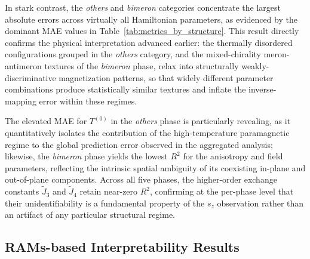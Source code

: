 \documentclass[final,5p,times,twocolumn]{elsarticle}
\begin{document}
In stark contrast, the \textit{others} and \textit{bimeron}
categories concentrate the largest absolute errors across
virtually all Hamiltonian parameters, as evidenced by the dominant
MAE values in Table~\ref{tab:metrics_by_structure}. This result
directly confirms the physical interpretation advanced earlier:
the thermally disordered configurations grouped in the
\textit{others} category, and the mixed-chirality meron-antimeron
textures of the \textit{bimeron} phase, relax into structurally
weakly-discriminative magnetization patterns, so that widely
different parameter combinations produce statistically similar
textures and inflate the inverse-mapping error within these
regimes. 

The elevated MAE for $T^{(0)}$ in the \textit{others}
phase is particularly revealing, as it quantitatively isolates the
contribution of the high-temperature paramagnetic regime to the
global prediction error observed in the aggregated analysis;
likewise, the \textit{bimeron} phase yields the lowest $R^2$ for
the anisotropy and field parameters, reflecting the intrinsic
spatial ambiguity of its coexisting in-plane and out-of-plane
components. Across all five phases, the higher-order exchange constants
$\tilde{J}_3$ and $\tilde{J}_4$ retain near-zero $R^2$, confirming
at the per-phase level that their unidentifiability is a
fundamental property of the $s_z$ observation rather than an
artifact of any particular structural regime.


\subsection{RAMs-based Interpretability Results}
\label{sec:rams_results}
\end{document}
